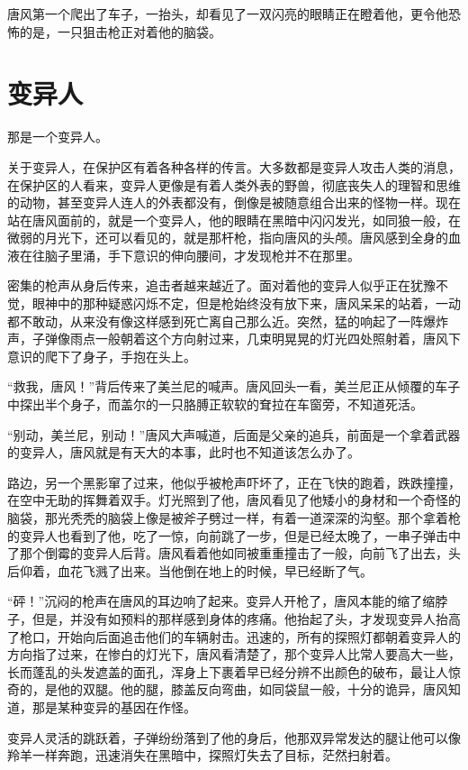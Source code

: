 唐风第一个爬出了车子，一抬头，却看见了一双闪亮的眼睛正在瞪着他，更令他恐怖的是，一只狙击枪正对着他的脑袋。

\chapter{变异人}

那是一个变异人。

关于变异人，在保护区有着各种各样的传言。大多数都是变异人攻击人类的消息，在保护区的人看来，变异人更像是有着人类外表的野兽，彻底丧失人的理智和思维的动物，甚至变异人连人的外表都没有，倒像是被随意组合出来的怪物一样。现在站在唐风面前的，就是一个变异人，他的眼睛在黑暗中闪闪发光，如同狼一般，在微弱的月光下，还可以看见的，就是那杆枪，指向唐风的头颅。唐风感到全身的血液在往脑子里涌，手下意识的伸向腰间，才发现枪并不在那里。

密集的枪声从身后传来，追击者越来越近了。面对着他的变异人似乎正在犹豫不觉，眼神中的那种疑惑闪烁不定，但是枪始终没有放下来，唐风呆呆的站着，一动都不敢动，从来没有像这样感到死亡离自己那么近。突然，猛的响起了一阵爆炸声，子弹像雨点一般朝着这个方向射过来，几束明晃晃的灯光四处照射着，唐风下意识的爬下了身子，手抱在头上。

“救我，唐风！”背后传来了美兰尼的喊声。唐风回头一看，美兰尼正从倾覆的车子中探出半个身子，而盖尔的一只胳膊正软软的耷拉在车窗旁，不知道死活。

“别动，美兰尼，别动！”唐风大声喊道，后面是父亲的追兵，前面是一个拿着武器的变异人，唐风就是有天大的本事，此时也不知道该怎么办了。

路边，另一个黑影窜了过来，他似乎被枪声吓坏了，正在飞快的跑着，跌跌撞撞，在空中无助的挥舞着双手。灯光照到了他，唐风看见了他矮小的身材和一个奇怪的脑袋，那光秃秃的脑袋上像是被斧子劈过一样，有着一道深深的沟壑。那个拿着枪的变异人也看到了他，吃了一惊，向前跳了一步，但是已经太晚了，一串子弹击中了那个倒霉的变异人后背。唐风看着他如同被重重撞击了一般，向前飞了出去，头后仰着，血花飞溅了出来。当他倒在地上的时候，早已经断了气。

“砰！”沉闷的枪声在唐风的耳边响了起来。变异人开枪了，唐风本能的缩了缩脖子，但是，并没有如预料的那样感到身体的疼痛。他抬起了头，才发现变异人抬高了枪口，开始向后面追击他们的车辆射击。迅速的，所有的探照灯都朝着变异人的方向指了过来，在惨白的灯光下，唐风看清楚了，那个变异人比常人要高大一些，长而蓬乱的头发遮盖的面孔，浑身上下裹着早已经分辨不出颜色的破布，最让人惊奇的，是他的双腿。他的腿，膝盖反向弯曲，如同袋鼠一般，十分的诡异，唐风知道，那是某种变异的基因在作怪。

变异人灵活的跳跃着，子弹纷纷落到了他的身后，他那双异常发达的腿让他可以像羚羊一样奔跑，迅速消失在黑暗中，探照灯失去了目标，茫然扫射着。

